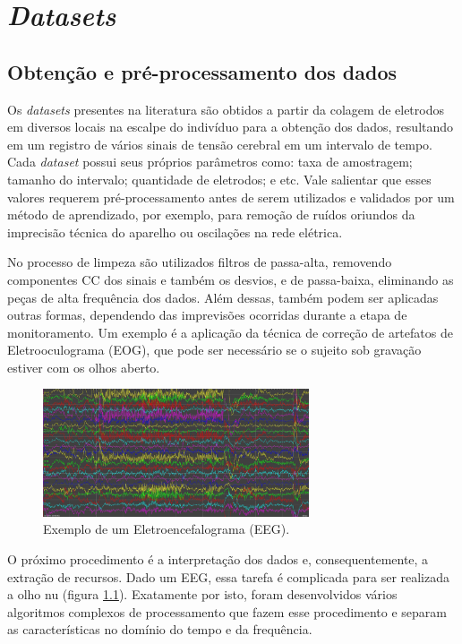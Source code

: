\chapter{\textit{Datasets}}\label{chp:datasets}

\section{Obtenção e pré-processamento dos dados}

Os \textit{datasets} presentes na literatura são obtidos a partir da colagem de eletrodos em diversos locais na escalpe do indivíduo para a obtenção dos dados, resultando em um registro de vários sinais de tensão cerebral em um intervalo de tempo. Cada \textit{dataset} possui seus próprios parâmetros como: taxa de amostragem; tamanho do intervalo; quantidade de eletrodos; e etc. Vale salientar que esses valores requerem pré-processamento antes de serem utilizados e validados por um método de aprendizado, por exemplo, para remoção de ruídos oriundos da imprecisão técnica do aparelho ou oscilações na rede elétrica.

No processo de limpeza são utilizados filtros de passa-alta, removendo componentes CC dos sinais e também os desvios, e de passa-baixa, eliminando as peças de alta frequência dos dados. Além dessas, também podem ser aplicadas outras formas, dependendo das imprevisões ocorridas durante a etapa de monitoramento. Um exemplo é a aplicação da técnica de correção de artefatos de Eletrooculograma (EOG), que pode ser necessário se o sujeito sob gravação estiver com os olhos aberto. \cite{EEGMANIQUINS}

\begin{figure}[!h]
    \centering
    \includegraphics[width=0.7\textwidth]{figuras/exemplo_eeg.jpg}
    \caption{Exemplo de um Eletroencefalograma (EEG).}
    \label{fig:exemplo_eeg}
\end{figure}

O próximo procedimento é a interpretação dos dados e, consequentemente, a extração de recursos. Dado um EEG, essa tarefa é complicada para ser realizada a olho nu (figura \ref{fig:exemplo_eeg}). Exatamente por isto, foram desenvolvidos vários algoritmos complexos de processamento que fazem esse procedimento e separam as características no domínio do tempo e da frequência.

